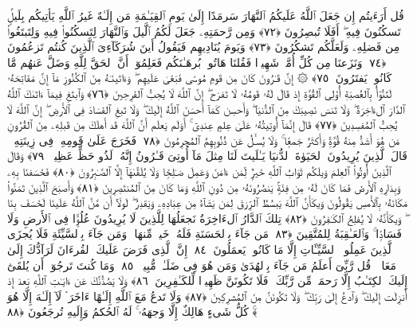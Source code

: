  قُل أَرَءَيتُم إِن جَعَلَ ٱللَّهُ عَلَيكُمُ ٱلنَّهَارَ سَرمَدًا إِلَىٰ يَومِ ٱلقِيَـٰمَةِ مَن إِلَـٰهٌ غَيرُ ٱللَّهِ يَأتِيكُم بِلَيلٍۢ تَسكُنُونَ فِيهِ ۖ أَفَلَا تُبصِرُونَ ﴿٧٢﴾
 وَمِن رَّحمَتِهِۦ جَعَلَ لَكُمُ ٱلَّيلَ وَٱلنَّهَارَ لِتَسكُنُوا۟ فِيهِ وَلِتَبتَغُوا۟ مِن فَضلِهِۦ وَلَعَلَّكُم تَشكُرُونَ ﴿٧٣﴾
 وَيَومَ يُنَادِيهِم فَيَقُولُ أَينَ شُرَكَآءِىَ ٱلَّذِينَ كُنتُم تَزعُمُونَ ﴿٧٤﴾
 وَنَزَعنَا مِن كُلِّ أُمَّةٍۢ شَهِيدًۭا فَقُلنَا هَاتُوا۟ بُرهَـٰنَكُم فَعَلِمُوٓا۟ أَنَّ ٱلحَقَّ لِلَّهِ وَضَلَّ عَنهُم مَّا كَانُوا۟ يَفتَرُونَ ﴿٧٥﴾
 ۞ إِنَّ قَـٰرُونَ كَانَ مِن قَومِ مُوسَىٰ فَبَغَىٰ عَلَيهِم ۖ وَءَاتَينَـٰهُ مِنَ ٱلكُنُوزِ مَآ إِنَّ مَفَاتِحَهُۥ لَتَنُوٓأُ بِٱلعُصبَةِ أُو۟لِى ٱلقُوَّةِ إِذ قَالَ لَهُۥ قَومُهُۥ لَا تَفرَح ۖ إِنَّ ٱللَّهَ لَا يُحِبُّ ٱلفَرِحِينَ ﴿٧٦﴾
 وَٱبتَغِ فِيمَآ ءَاتَىٰكَ ٱللَّهُ ٱلدَّارَ ٱلءَاخِرَةَ ۖ وَلَا تَنسَ نَصِيبَكَ مِنَ ٱلدُّنيَا ۖ وَأَحسِن كَمَآ أَحسَنَ ٱللَّهُ إِلَيكَ ۖ وَلَا تَبغِ ٱلفَسَادَ فِى ٱلأَرضِ ۖ إِنَّ ٱللَّهَ لَا يُحِبُّ ٱلمُفسِدِينَ ﴿٧٧﴾
 قَالَ إِنَّمَآ أُوتِيتُهُۥ عَلَىٰ عِلمٍ عِندِىٓ ۚ أَوَلَم يَعلَم أَنَّ ٱللَّهَ قَد أَهلَكَ مِن قَبلِهِۦ مِنَ ٱلقُرُونِ مَن هُوَ أَشَدُّ مِنهُ قُوَّةًۭ وَأَكثَرُ جَمعًۭا ۚ وَلَا يُسـَٔلُ عَن ذُنُوبِهِمُ ٱلمُجرِمُونَ ﴿٧٨﴾
 فَخَرَجَ عَلَىٰ قَومِهِۦ فِى زِينَتِهِۦ ۖ قَالَ ٱلَّذِينَ يُرِيدُونَ ٱلحَيَوٰةَ ٱلدُّنيَا يَـٰلَيتَ لَنَا مِثلَ مَآ أُوتِىَ قَـٰرُونُ إِنَّهُۥ لَذُو حَظٍّ عَظِيمٍۢ ﴿٧٩﴾
 وَقَالَ ٱلَّذِينَ أُوتُوا۟ ٱلعِلمَ وَيلَكُم ثَوَابُ ٱللَّهِ خَيرٌۭ لِّمَن ءَامَنَ وَعَمِلَ صَـٰلِحًۭا وَلَا يُلَقَّىٰهَآ إِلَّا ٱلصَّـٰبِرُونَ ﴿٨٠﴾
 فَخَسَفنَا بِهِۦ وَبِدَارِهِ ٱلأَرضَ فَمَا كَانَ لَهُۥ مِن فِئَةٍۢ يَنصُرُونَهُۥ مِن دُونِ ٱللَّهِ وَمَا كَانَ مِنَ ٱلمُنتَصِرِينَ ﴿٨١﴾
 وَأَصبَحَ ٱلَّذِينَ تَمَنَّوا۟ مَكَانَهُۥ بِٱلأَمسِ يَقُولُونَ وَيكَأَنَّ ٱللَّهَ يَبسُطُ ٱلرِّزقَ لِمَن يَشَآءُ مِن عِبَادِهِۦ وَيَقدِرُ ۖ لَولَآ أَن مَّنَّ ٱللَّهُ عَلَينَا لَخَسَفَ بِنَا ۖ وَيكَأَنَّهُۥ لَا يُفلِحُ ٱلكَـٰفِرُونَ ﴿٨٢﴾
 تِلكَ ٱلدَّارُ ٱلءَاخِرَةُ نَجعَلُهَا لِلَّذِينَ لَا يُرِيدُونَ عُلُوًّۭا فِى ٱلأَرضِ وَلَا فَسَادًۭا ۚ وَٱلعَـٰقِبَةُ لِلمُتَّقِينَ ﴿٨٣﴾
 مَن جَآءَ بِٱلحَسَنَةِ فَلَهُۥ خَيرٌۭ مِّنهَا ۖ وَمَن جَآءَ بِٱلسَّيِّئَةِ فَلَا يُجزَى ٱلَّذِينَ عَمِلُوا۟ ٱلسَّيِّـَٔاتِ إِلَّا مَا كَانُوا۟ يَعمَلُونَ ﴿٨٤﴾
 إِنَّ ٱلَّذِى فَرَضَ عَلَيكَ ٱلقُرءَانَ لَرَآدُّكَ إِلَىٰ مَعَادٍۢ ۚ قُل رَّبِّىٓ أَعلَمُ مَن جَآءَ بِٱلهُدَىٰ وَمَن هُوَ فِى ضَلَـٰلٍۢ مُّبِينٍۢ ﴿٨٥﴾
 وَمَا كُنتَ تَرجُوٓا۟ أَن يُلقَىٰٓ إِلَيكَ ٱلكِتَـٰبُ إِلَّا رَحمَةًۭ مِّن رَّبِّكَ ۖ فَلَا تَكُونَنَّ ظَهِيرًۭا لِّلكَـٰفِرِينَ ﴿٨٦﴾
 وَلَا يَصُدُّنَّكَ عَن ءَايَـٰتِ ٱللَّهِ بَعدَ إِذ أُنزِلَت إِلَيكَ ۖ وَٱدعُ إِلَىٰ رَبِّكَ ۖ وَلَا تَكُونَنَّ مِنَ ٱلمُشرِكِينَ ﴿٨٧﴾
 وَلَا تَدعُ مَعَ ٱللَّهِ إِلَـٰهًا ءَاخَرَ ۘ لَآ إِلَـٰهَ إِلَّا هُوَ ۚ كُلُّ شَىءٍ هَالِكٌ إِلَّا وَجهَهُۥ ۚ لَهُ ٱلحُكمُ وَإِلَيهِ تُرجَعُونَ ﴿٨٨﴾
 
